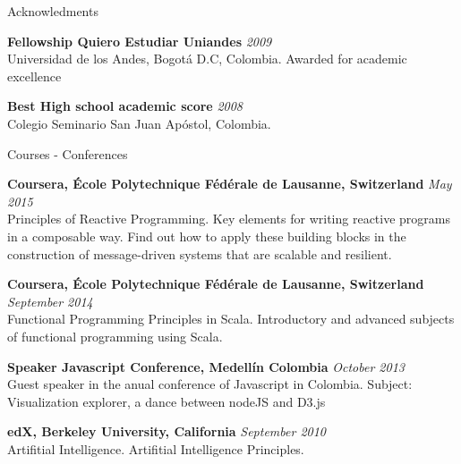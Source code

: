 \documentclass[spanish]{resume}
\begin{document}
\begin{rSection}{Acknowledments}

{\bf Fellowship Quiero Estudiar Uniandes} \hfill {\em 2009} \\
Universidad de los Andes, Bogot\'a D.C, Colombia.
Awarded for academic excellence

{\bf Best High school academic score} \hfill {\em 2008} \\
Colegio Seminario San Juan Ap\'ostol, Colombia.

\end{rSection}


\begin{rSection}{Courses - Conferences}

{\bf Coursera, \'Ecole Polytechnique F\'ed\'erale de Lausanne, Switzerland} \hfill {\em May 2015} \\
Principles of Reactive Programming.
Key elements for writing reactive programs in a composable way. Find out how to apply these building blocks in the construction of message-driven systems that are scalable and resilient.

{\bf Coursera, \'Ecole Polytechnique F\'ed\'erale de Lausanne, Switzerland} \hfill {\em September 2014} \\
Functional Programming Principles in Scala.
Introductory and advanced subjects of functional programming using Scala.

{\bf Speaker Javascript Conference, Medell\'in Colombia} \hfill {\em October 2013} \\
Guest speaker in the anual conference of Javascript in Colombia.
Subject: Visualization explorer, a dance between nodeJS and D3.js

{\bf edX, Berkeley University, California} \hfill {\em September 2010} \\
Artifitial Intelligence.
Artifitial Intelligence Principles.

\end{rSection}
\end{document}
